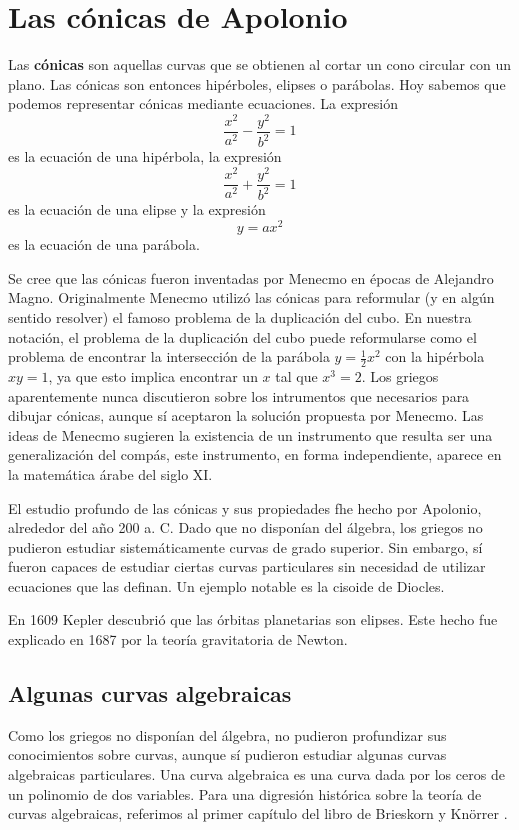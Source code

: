 \chapter{Las cónicas de Apolonio}

Las \textbf{cónicas} son aquellas curvas que se obtienen al cortar un cono
circular con un plano. Las cónicas son entonces hipérboles, elipses o
parábolas. Hoy sabemos que podemos representar cónicas mediante ecuaciones. La expresión 
\[
	\frac{x^2}{a^2}-\frac{y^2}{b^2}=1
\]
es la ecuación de una hipérbola, la expresión 
\[
	\frac{x^2}{a^2}+\frac{y^2}{b^2}=1
\]
es la ecuación de una elipse y la expresión 
\[	
	y=ax^2
\]
es la ecuación de una parábola. 

Se cree que las cónicas fueron inventadas por Menecmo en épocas de Alejandro
Magno. Originalmente Menecmo utilizó las cónicas para reformular (y en algún
sentido resolver) el famoso problema de la duplicación del cubo. En nuestra
notación, el problema de la duplicación del cubo puede reformularse como el
problema de encontrar la intersección de la parábola $y=\frac12x^2$ con la
hipérbola $xy=1$, ya que esto implica encontrar un $x$ tal que $x^3=2$. Los
griegos aparentemente nunca discutieron sobre los intrumentos que necesarios
para dibujar cónicas, aunque sí aceptaron la solución propuesta por Menecmo.
Las ideas de Menecmo sugieren la existencia de un instrumento que resulta ser
una generalización del compás, este instrumento, en forma independiente,
aparece en la matemática árabe del siglo XI. 

El estudio profundo de las cónicas y sus propiedades fhe hecho por Apolonio,
alrededor del año 200 a. C.  Dado que no disponían del álgebra, los griegos no
pudieron estudiar sistemáticamente curvas de grado superior. Sin embargo, sí
fueron capaces de estudiar ciertas curvas particulares sin necesidad de
utilizar ecuaciones que las definan. Un ejemplo notable es la cisoide de
Diocles. 

En 1609 Kepler descubrió que las órbitas planetarias son elipses. Este hecho fue
explicado en 1687 por la teoría gravitatoria de Newton. 

\section*{Algunas curvas algebraicas}

Como los griegos no disponían del álgebra, no pudieron profundizar sus
conocimientos sobre curvas, aunque sí pudieron estudiar algunas curvas
algebraicas particulares. Una curva algebraica es una curva dada por los ceros
de un polinomio de dos variables.  Para una digresión histórica sobre la teoría
de curvas algebraicas, referimos al primer capítulo del libro de Brieskorn y
Kn\"{o}rrer \cite{MR2975988}.

